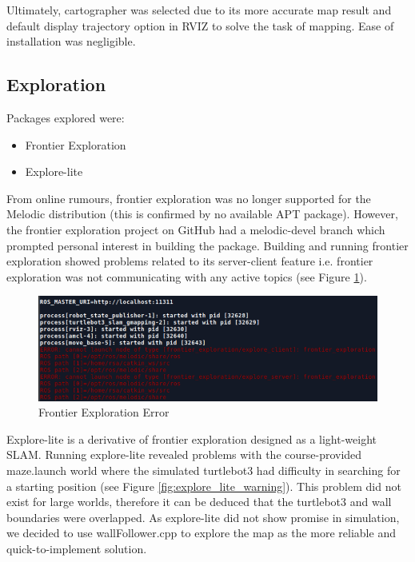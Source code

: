 \documentclass[11pt, a4, nocenter, margin=150mm]{article}
\begin{document}
		Ultimately, cartographer was selected due to its more accurate map result and default display trajectory option in RVIZ to solve the task of mapping. Ease of installation was negligible.

	\subsection{Exploration}
	\label{sec:explore}

	Packages explored were:
	\begin{itemize}[noitemsep, nolistsep]
		\item Frontier Exploration
		\item Explore-lite
	\end{itemize}

	From online rumours, frontier exploration was no longer supported for the Melodic distribution (this is confirmed by no available APT package). However, the frontier exploration project on GitHub had a melodic-devel branch which prompted personal interest in building the package. Building and running frontier exploration showed problems related to its server-client feature i.e. frontier exploration was not communicating with any active topics (see Figure \ref{fig:frontier_error}).

	\begin{figure}[h!]
		\centering
		\includegraphics[width=120mm]{frontier-error.png}
		\caption{Frontier Exploration Error}
		\label{fig:frontier_error}
	\end{figure}

	Explore-lite is a derivative of frontier exploration designed as a light-weight SLAM. Running explore-lite revealed problems with the course-provided maze.launch world where the simulated turtlebot3 had difficulty in searching for a starting position (see Figure \ref{fig:explore_lite_warning}). This problem did not exist for large worlds, therefore it can be deduced that the turtlebot3 and wall boundaries were overlapped. As explore-lite did not show promise in simulation, we decided to use wallFollower.cpp to explore the map as the more reliable and quick-to-implement solution.
\end{document}
